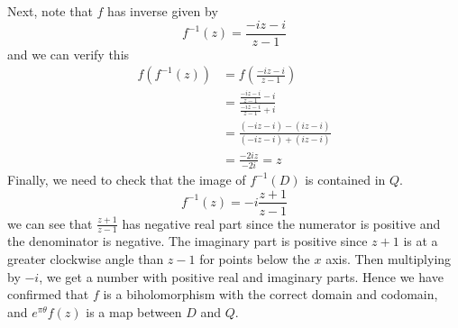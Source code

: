 \documentclass{homework}
\begin{document}
\begin{solution}
                                                                                            Next, note that $f$ has inverse given by 
                                                                                            \[
                                                                                            f^{-1}(z) = \frac{-iz-i}{z-1}
                                                                                            \]
                                                                                            and we can verify this
                                                                                            \begin{align*}
                                                                                            f(f^{-1}(z)) &= f(\frac{-iz-i}{z-1}) \\
                                                                                            &=
                                                                                            \frac{\frac{-iz-i}{z-1} - i}{\frac{-iz-i}{z-1} + i}\\
                                                                                            &= 
                                                                                            \frac{(-iz-i) - (iz - i)}{(-iz -i) + (iz - i)}\\
                                                                                            &= \frac{-2iz}{-2i} = z
                                                                                            \end{align*}
                                                                                            Finally, we need to check that the image of $f^{-1}(D)$ is contained in $Q$. 
                                                                                            \[
                                                                                            f^{-1}(z) = -i\frac{z+1}{z-1}
                                                                                            \]
                                                                                            we can see that $\frac{z+1}{z-1}$ has negative real part since the numerator is positive and the denominator is negative. The imaginary part is positive since $z+1$ is at a greater clockwise angle than $z-1$ for points below the $x$ axis. Then multiplying by $-i$, we get a number with positive real and imaginary parts. Hence we have confirmed that $f$ is a biholomorphism with the correct domain and codomain, and $e^{\pi \theta}f(z)$ is a map between $D$ and $Q$.

                                                                                            \end{solution}
\end{document}

